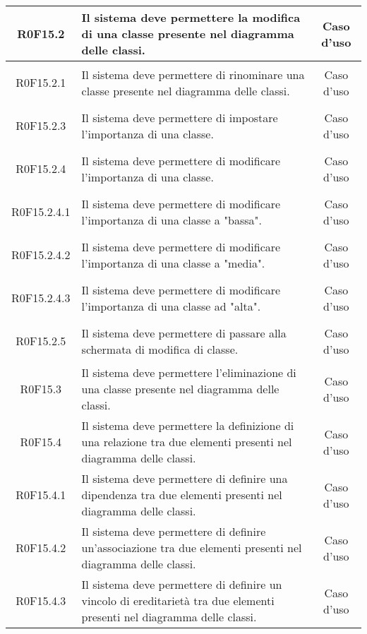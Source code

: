 \documentclass[../AnalisiDeiRequisiti.tex]{subfiles}
\begin{document}
\begin{longtable}{|c|>{\centering}p{7cm}|c|}
\hypertarget{R0F15.2}{R0F15.2} & Il sistema deve permettere la modifica di una classe presente nel diagramma delle classi. & Caso d'uso \\ \hline
\hypertarget{R0F15.2.1}{R0F15.2.1} & Il sistema deve permettere di rinominare una classe presente nel diagramma delle classi. & Caso d'uso \\ \hline
\hypertarget{R0F15.2.3}{R0F15.2.3} & Il sistema deve permettere di impostare l'importanza di una classe. & Caso d'uso \\ \hline
\hypertarget{R0F15.2.4}{R0F15.2.4} & Il sistema deve permettere di modificare l'importanza di una classe. & Caso d'uso \\ \hline
\hypertarget{R0F15.2.4.1}{R0F15.2.4.1} & Il sistema deve permettere di modificare l'importanza di una classe a "bassa". & Caso d'uso \\ \hline
\hypertarget{R0F15.2.4.2}{R0F15.2.4.2} & Il sistema deve permettere di modificare l'importanza di una classe a "media". & Caso d'uso \\ \hline
\hypertarget{R0F15.2.4.3}{R0F15.2.4.3} & Il sistema deve permettere di modificare l'importanza di una classe ad "alta". & Caso d'uso \\ \hline
\hypertarget{R0F15.2.5}{R0F15.2.5} & Il sistema deve permettere di passare alla schermata di modifica di classe. & Caso d'uso \\ \hline
\hypertarget{R0F15.3}{R0F15.3} & Il sistema deve permettere l'eliminazione di una classe presente nel diagramma delle classi. & Caso d'uso \\ \hline
\hypertarget{R0F15.4}{R0F15.4} & Il sistema deve permettere la definizione di una relazione tra due elementi presenti nel diagramma delle classi. & Caso d'uso \\ \hline
\hypertarget{R0F15.4.1}{R0F15.4.1} & Il sistema deve permettere di definire una dipendenza tra due elementi presenti nel diagramma delle classi. & Caso d'uso \\ \hline
\hypertarget{R0F15.4.2}{R0F15.4.2} & Il sistema deve permettere di definire un'associazione tra due elementi presenti nel diagramma delle classi. & Caso d'uso \\ \hline
\hypertarget{R0F15.4.3}{R0F15.4.3} & Il sistema deve permettere di definire un vincolo di ereditarietà tra due elementi presenti nel diagramma delle classi. & Caso d'uso \\ \hline

\end{longtable}
\end{document}
